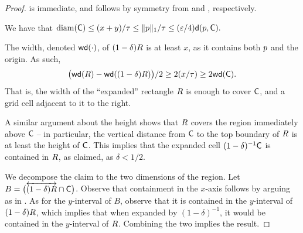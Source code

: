\documentclass[12pt]{article}%
\begin{document}
\begin{proof}
     is immediate,  and 
    follows by symmetry from  and ,
    respectively.

    \smallskip%
    \noindent%
     We have that
    \begin{math}
        \diameterX{\cell}%
        \leq%
        (x+y) /\gConst%
        \leq%
        \|\pa\|_1 /\gConst \leq %
        (\eps/4) \dsY{\pa}{\cell}.
    \end{math}

    \smallskip%
    \noindent%
     The width, denoted $\widthX{\cdot}$, of $(1-\delta)R$ is at least $x$,
    as it contains both $p$ and the origin. As such,
    \begin{equation*}
        \bigl( \widthX{\rect} - \widthX{(1-\delta)\rect} \bigr)/2 \geq
        2(x /\tau) \geq 2 \widthX{\cell}.
    \end{equation*}
    That is, the width of the ``expanded'' rectangle $R$ is enough
    to cover $\mathsf{C}$, and a grid cell adjacent to it to the right.

    A similar argument about the height shows that $R$ covers the
    region immediately above $\mathsf{C}$ -- in particular, the vertical
    distance from $\mathsf{C}$ to the top boundary of $R$ is at least
    the height of $\mathsf{C}$. This implies that the expanded cell
    $(1-\delta)^{-1}\mathsf{C}$ is contained in $R$, as claimed, as
    $\delta < 1/2$.


    \smallskip%
    \noindent%
     We decompose the claim to the two dimensions of the
    region. Let
    $B = \bigl(\overleftrightarrow{ (1-\delta)R} \cap \mathsf{C}
    \bigr)$. Observe that containment in the $x$-axis follows by
    arguing as in . As for the $y$-interval of $B$,
    observe that it is contained in the $y$-interval of
    $(1-\delta)R$, which implies that when expanded by
    $(1-\delta)^{-1}$, it would be contained in the $y$-interval of
    $R$. Combining the two implies the result.
\end{proof}
\end{document}
